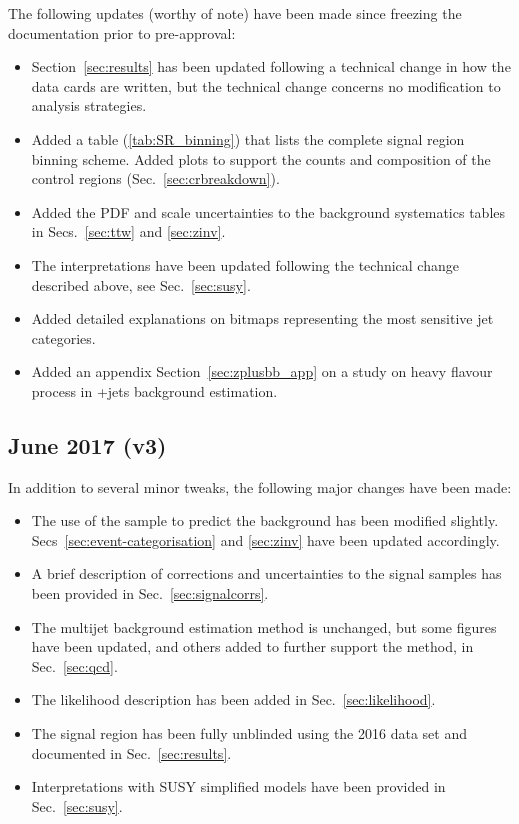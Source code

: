 The following updates (worthy of note) have been made since freezing
the documentation prior to pre-approval:
\begin{itemize}
\item Section~\ref{sec:results} has been updated following a technical change 
  in how the data cards are written, but the technical change concerns 
  no modification to analysis strategies.
\item Added a table (\ref{tab:SR_binning}) that lists the complete
  signal region binning scheme. Added plots to support the counts and
  composition of the control regions (Sec.~\ref{sec:crbreakdown}).
\item Added the PDF and scale uncertainties to the background
  systematics tables in Secs.~\ref{sec:ttw} and \ref{sec:zinv}.
\item The interpretations have been updated following the technical
  change described above, see Sec.~\ref{sec:susy}.
\item Added detailed explanations on bitmaps representing the most sensitive 
  jet categories.
\item Added an appendix Section~\ref{sec:zplusbb_app} on a study on heavy 
  flavour process in \znunu+jets background estimation.
\end{itemize}

\subsection{June  2017 (v3)}

In addition to several minor tweaks, the following major changes have
been made:
\begin{itemize}
\item The use of the \mmj sample to predict the \znunuj background has
  been modified slightly. Secs~\ref{sec:event-categorisation} and
  \ref{sec:zinv} have been updated accordingly.
\item A brief description of corrections and uncertainties to the
  signal samples has been provided in Sec.~\ref{sec:signalcorrs}.
\item The multijet background estimation method is unchanged, but some
  figures have been updated, and others added to further support the
  method, in Sec.~\ref{sec:qcd}. 
\item The likelihood description has been added in
  Sec.~\ref{sec:likelihood}. 
\item The signal region has been fully unblinded using the 2016 data
  set and documented in Sec.~\ref{sec:results}. 
\item Interpretations with SUSY simplified models have been provided
  in Sec.~\ref{sec:susy}. 
\end{itemize}

